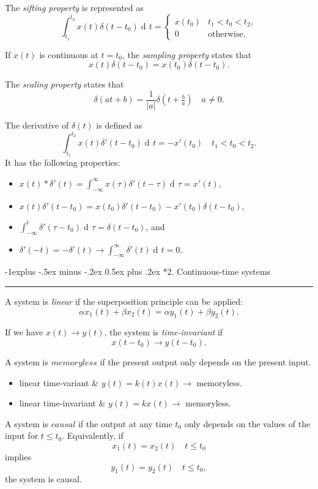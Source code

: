 \documentclass[10pt,letterpaper]{article}
\makeatletter
\DeclareMathOperator{\di}{d\!} %
\newcommand{\bracks}[1]{ \left( #1 \right) } %
\newcommand{\abs}[1]{\left| #1 \right|} %
\newcommand{\impulse}{ \delta(t) }
\newcommand{\dimpulse}{ \delta'(t) }
\newcommand{\Iint}{ \int_{-\infty}^{\infty} }
\newcommand{\tint}{ \int_{t_1}^{t_2} }
\newcommand{\underlineSection}[1][unnamed]{
\subsection*{#1}
\hrule
\vspace{12pt}
}
\renewcommand{\subsection}{\@startsection{subsection}{2}{0mm}%
                                {-1explus -.5ex minus -.2ex}%
                                {0.5ex plus .2ex}%
                                {\normalfont\normalsize\bfseries}}
\makeatother
\begin{document}
\begin{multicols*}{3}
The \textit{sifting property} is represented as
\[ \tint x(t)\delta(t-t_0) \di t = \begin{cases} 
      								x(t_0) & t_1 < t_0 < t_2, \\
      								0 & \text{otherwise}. 
   									\end{cases}
\]

If $x(t)$ is continuous at $t = t_0$, the \textit{sampling property} states that
\[ x(t)\delta(t-t_0) = x(t_0)\delta(t-t_0). \]

The \textit{scaling property} states that
\[ \delta(at + b) = \dfrac{1}{\abs{a}} \delta\bracks{t + \tfrac{b}{a}} \quad a \neq 0. \]

The derivative of $\impulse$ is defined as
\[ \tint x(t) \delta'(t-t_0) \di t = -x'(t_0) \quad t_1 < t_0 < t_2. \]
It has the following properties:
\begin{itemize}[leftmargin=0.5cm]
\item $\displaystyle x(t)*\dimpulse = \Iint x(\tau)\delta'(t-\tau) \di \tau = x'(t)$,
\item $x(t)\delta'(t-t_0) = x(t_0)\delta'(t-t_0) - x'(t_0)\delta(t-t_0)$,
\item $\displaystyle \int_{-\infty}^t \delta'(\tau - t_0) \di \tau = \delta(t-t_0)$, and
\item $\displaystyle \delta'(-t) = -\delta'(t) \rightarrow \Iint \dimpulse \di t = 0$.
\end{itemize}

\underlineSection[2. Continuous-time systems]
A system is \textit{linear} if the superposition principle can be applied:
\[ \alpha x_1(t) + \beta x_2(t) = \alpha y_1(t) + \beta y_2(t). \]

If we have $x(t) \rightarrow y(t)$, the system is \textit{time-invariant} if
\[ x(t-t_0) \rightarrow y(t-t_0). \]

A system is $memoryless$ if the present output only depends on the present input. 
\begin{itemize}[leftmargin=0.5cm]
\item linear time-variant \& $y(t) = k(t)x(t) \rightarrow$ memoryless.
\item linear time-invariant \& $y(t) = kx(t) \rightarrow$ memoryless.
\end{itemize}

A system is $causal$ if the output at any time $t_0$ only depends on the values of the input for $t \leq t_0$. Equivalently, if
\[ x_1(t) = x_2(t) \quad t \leq t_0 \]
implies
\[ y_1(t) = y_2(t) \quad t \leq t_0, \]
the system is causal.


\end{multicols*}
\end{document}
